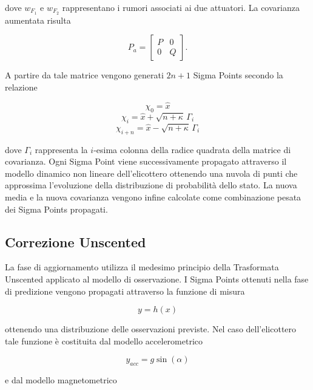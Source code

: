 \documentclass[12pt,a4paper]{article}
\begin{document}
dove $w_{F_1}$ e $w_{F_2}$ rappresentano i rumori associati ai due attuatori.
La covarianza aumentata risulta

\begin{equation}
P_a =
\begin{bmatrix}
P & 0 \\
0 & Q
\end{bmatrix}.
\end{equation}

A partire da tale matrice vengono generati $2n+1$ Sigma Points secondo la relazione

\begin{equation}
\chi_0 = \hat{x}
\end{equation}
\begin{equation}
\chi_i = \hat{x} + \sqrt{n+\kappa} \, \Gamma_i
\end{equation}
\begin{equation}
\chi_{i+n} = \hat{x} - \sqrt{n+\kappa} \, \Gamma_i
\end{equation}

dove $\Gamma_i$ rappresenta la $i$-esima colonna della radice quadrata della matrice di covarianza.
Ogni Sigma Point viene successivamente propagato attraverso il modello dinamico non lineare dell'elicottero ottenendo una nuvola di punti che approssima l'evoluzione della distribuzione di probabilità dello stato.
La nuova media e la nuova covarianza vengono infine calcolate come combinazione pesata dei Sigma Points propagati.


\subsection{Correzione Unscented}
La fase di aggiornamento utilizza il medesimo principio della Trasformata Unscented applicato al modello di osservazione.
I Sigma Points ottenuti nella fase di predizione vengono propagati attraverso la funzione di misura

\begin{equation}
y = h(x)
\end{equation}

ottenendo una distribuzione delle osservazioni previste.
Nel caso dell'elicottero tale funzione è costituita dal modello accelerometrico

\begin{equation}
y_{acc} = g\sin(\alpha)
\end{equation}

e dal modello magnetometrico
\end{document}
